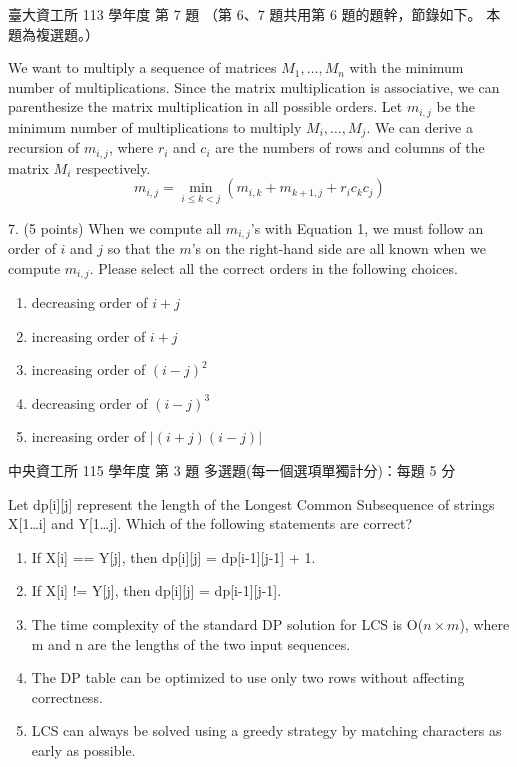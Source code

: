 \begin{pastexam}[label={px:dp-2}]{臺大資工所 113 學年度 第 7 題}
（第 6、7 題共用第 6 題的題幹，節錄如下。 本題為複選題。）

We want to multiply a sequence of matrices $M_1,\ldots,M_n$ with the minimum number of multiplications. Since the matrix multiplication is associative, we can parenthesize the matrix multiplication in all possible orders. Let $m_{i,j}$ be the minimum number of multiplications to multiply $M_i,\ldots,M_j$. We can derive a recursion of $m_{i,j}$, where $r_i$ and $c_i$ are the numbers of rows and columns of the matrix $M_i$ respectively.
\begin{equation*}
m_{i,j}=\min_{i\le k<j}(m_{i,k}+m_{k+1,j}+r_ic_kc_j) \tag{1}
\end{equation*}

7. (5 points) When we compute all $m_{i,j}$'s with Equation 1, we must follow an order of $i$ and $j$ so that the $m$'s on the right-hand side are all known when we compute $m_{i,j}$. Please select all the correct orders in the following choices.
\begin{enumerate}[label=\Alph*.]
\item decreasing order of $i+j$
\item increasing order of $i+j$
\item increasing order of $(i-j)^2$
\item decreasing order of $(i-j)^3$
\item increasing order of $|(i+j)(i-j)|$
\end{enumerate}
\end{pastexam}

\begin{pastexam}[label={px:dp-3}]{中央資工所 115 學年度 第 3 題}
多選題(每一個選項單獨計分)：每題 5 分

Let dp[i][j] represent the length of the Longest Common Subsequence of strings X[1\ldots i] and Y[1\ldots j]. Which of the following statements are correct?
\begin{enumerate}[label=\Alph*.]
\item If X[i] == Y[j], then dp[i][j] = dp[i-1][j-1] + 1.
\item If X[i] != Y[j], then dp[i][j] = dp[i-1][j-1].
\item The time complexity of the standard DP solution for LCS is O($n\times m$), where m and n are the lengths of the two input sequences.
\item The DP table can be optimized to use only two rows without affecting correctness.
\item LCS can always be solved using a greedy strategy by matching characters as early as possible.
\end{enumerate}
\end{pastexam}


